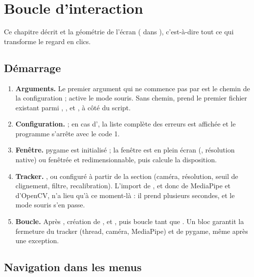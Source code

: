 \chapter{Boucle d'interaction}
\label{chap:interaction}

Ce chapitre décrit  et la géométrie de l'écran ( dans ), c'est-à-dire tout ce qui transforme le regard en clics.

\section{Démarrage}

\begin{enumerate}
  \item \textbf{Arguments.} Le premier argument qui ne commence pas par \code{--} est le chemin de la configuration ;  active le mode souris. Sans chemin,  prend le premier fichier existant parmi , ,  et , à côté du script.
  \item \textbf{Configuration.}  ; en cas d', la liste complète des erreurs est affichée et le programme s'arrête avec le code 1.
  \item \textbf{Fenêtre.} pygame est initialisé ; la fenêtre est en plein écran (, résolution native) ou fenêtrée et redimensionnable, puis  calcule la disposition.
  \item \textbf{Tracker.} , ou  configuré à partir de la section  (caméra, résolution, seuil de clignement, filtre, recalibration). L'import de , et donc de MediaPipe et d'OpenCV, n'a lieu qu'à ce moment-là : il prend plusieurs secondes, et le mode souris s'en passe.
  \item \textbf{Boucle.} Après , création de ,  et , puis boucle tant que . Un bloc  garantit la fermeture du tracker (thread, caméra, MediaPipe) et de pygame, même après une exception.
\end{enumerate}

\section{Navigation dans les menus}


